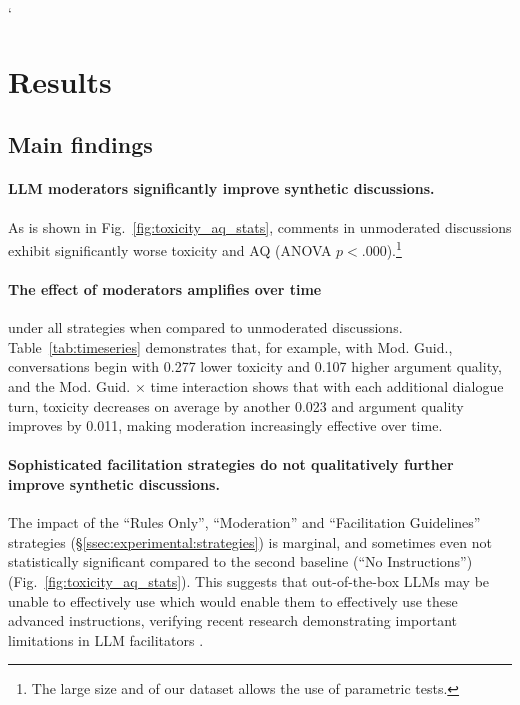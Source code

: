 `%
%

\section{Results}
\label{sec:results}


\subsection{Main findings}

\paragraph{\ac{LLM} moderators significantly improve synthetic discussions.} As is shown in Fig.~\ref{fig:toxicity_aq_stats}, comments in unmoderated discussions exhibit significantly worse toxicity and \ac{AQ} (ANOVA $p<.000$).\footnote{The large size and of our dataset allows the use of parametric tests.} 

\paragraph{The effect of moderators amplifies over time} under all strategies when compared to unmoderated discussions. Table~\ref{tab:timeseries} demonstrates that, for example, with Mod. Guid., conversations begin with 0.277 lower toxicity and 0.107 higher argument quality, and the Mod. Guid. × time interaction shows that with each additional dialogue turn, toxicity decreases on average by another 0.023 and argument quality improves by 0.011, making moderation increasingly effective over time.

\paragraph{Sophisticated facilitation strategies do not qualitatively further improve synthetic discussions.} The impact of the ``Rules Only'', ``Moderation'' and ``Facilitation Guidelines''  strategies (\S\ref{ssec:experimental:strategies}) is marginal, and sometimes even not statistically significant compared to the second baseline (``No Instructions'') (Fig.~\ref{fig:toxicity_aq_stats}). This suggests that out-of-the-box \acp{LLM} may be unable to effectively use which would enable them to effectively use these advanced instructions, verifying recent research demonstrating important limitations in \ac{LLM} facilitators \cite{cho-etal-2024-language}. %

